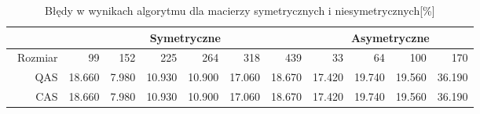 \begin{table}
\centering
\begin{tabular}{|r|r|r|r|r|r|r|r|r|r|r|}
\hline
 & \multicolumn{6}{|c|}{Symetryczne} & \multicolumn{4}{|c|}{Asymetryczne} \\ \hline\
Rozmiar & 99 & 152 & 225 & 264 & 318 & 439 & 33 & 64 & 100 & 170 \\ \hline
QAS & 18.660 & 7.980 & 10.930 & 10.900 & 17.060 & 18.670 & 17.420 & 19.740 & 19.560 & 36.190 \\
CAS & 18.660 & 7.980 & 10.930 & 10.900 & 17.060 & 18.670 & 17.420 & 19.740 & 19.560 & 36.190 \\ \hline
\end{tabular}
\caption{Błędy w wynikach algorytmu dla macierzy symetrycznych i niesymetrycznych[\%]}
\label{tab:error_AoFeroMet}
\end{table}

